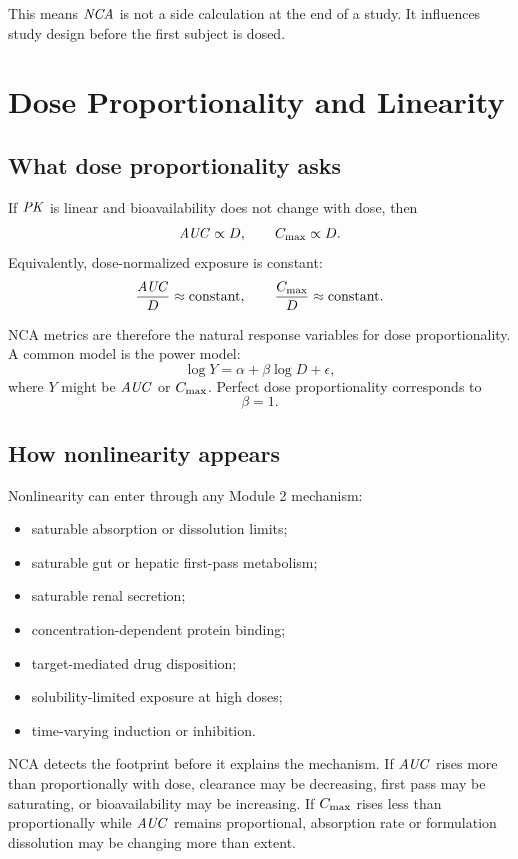 \documentclass[a4paper]{article}
\newcommand{\AUC}{\ensuremath{\pksym{AUC}}}
\newcommand{\Cmax}{\ensuremath{C_{\pklab{max}}}}
\newcommand{\PK}{\ensuremath{\pksym{PK}}}
\newcommand{\NCA}{\ensuremath{\pksym{NCA}}}
\begin{document}
This means \NCA{} is not a side calculation at the end of a study. It influences study design before the first subject is dosed.

\section{Dose Proportionality and Linearity}

\subsection{What dose proportionality asks}

If \PK{} is linear and bioavailability does not change with dose, then
\[
  \AUC \propto D,
  \qquad
  \Cmax \propto D.
\]
Equivalently, dose-normalized exposure is constant:
\[
  \frac{\AUC}{D}\approx\text{constant},
  \qquad
  \frac{\Cmax}{D}\approx\text{constant}.
\]

NCA metrics are therefore the natural response variables for dose proportionality. A common model is the power model:
\[
  \log Y = \alpha+\beta\log D+\epsilon,
\]
where \(Y\) might be \AUC{} or \Cmax{}. Perfect dose proportionality corresponds to
\[
  \beta=1.
\]

\subsection{How nonlinearity appears}

Nonlinearity can enter through any Module 2 mechanism:
\begin{itemize}[leftmargin=2em]
  \item saturable absorption or dissolution limits;
  \item saturable gut or hepatic first-pass metabolism;
  \item saturable renal secretion;
  \item concentration-dependent protein binding;
  \item target-mediated drug disposition;
  \item solubility-limited exposure at high doses;
  \item time-varying induction or inhibition.
\end{itemize}

NCA detects the footprint before it explains the mechanism. If \AUC{} rises more than proportionally with dose, clearance may be decreasing, first pass may be saturating, or bioavailability may be increasing. If \Cmax{} rises less than proportionally while \AUC{} remains proportional, absorption rate or formulation dissolution may be changing more than extent.
\end{document}
